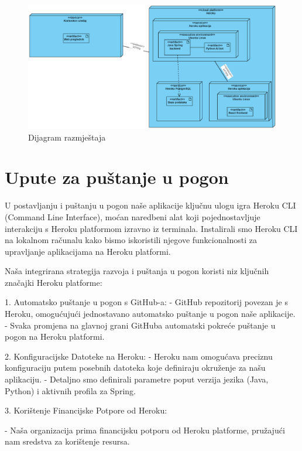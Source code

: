             \begin{figure}[H]
             \centering
             \includegraphics[width=1\linewidth]{slike/Dijagram razmjestaja.png}
             \caption{Dijagram razmještaja}
             \end{figure}
			\eject
		
		\section{Upute za puštanje u pogon}
		
		
U postavljanju i puštanju u pogon naše aplikacije ključnu ulogu igra Heroku CLI (Command Line Interface), moćan naredbeni alat koji pojednostavljuje interakciju s Heroku platformom izravno iz terminala. Instalirali smo Heroku CLI na lokalnom računalu kako bismo iskoristili njegove funkcionalnosti za upravljanje aplikacijama na Heroku platformi.

Naša integrirana strategija razvoja i puštanja u pogon koristi niz ključnih značajki Heroku platforme:

1. Automatsko puštanje u pogon s GitHub-a:
   - GitHub repozitorij povezan je s Heroku, omogućujući jednostavano automatsko puštanje u pogon naše aplikacije.
   - Svaka promjena na glavnoj grani GitHuba automatski pokreće puštanje u pogon na Heroku platformi.

2. Konfiguracijske Datoteke na Heroku:
   - Heroku nam omogućava preciznu konfiguraciju putem posebnih datoteka koje definiraju okruženje za našu aplikaciju.
   - Detaljno smo definirali parametre poput verzija jezika (Java, Python) i aktivnih profila za Spring.

3. Korištenje Financijske Potpore od Heroku:

   - Naša organizacija prima financijsku potporu od Heroku platforme, pružajući nam sredstva za korištenje resursa.


